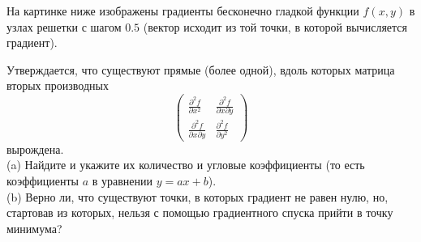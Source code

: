 \documentclass{article}
\begin{document}
На картинке ниже изображены градиенты бесконечно гладкой функции $f(x,y)$ в узлах решетки с шагом $0.5$ (вектор исходит из той точки, в которой вычисляется градиент).
\begin{figure}[h]
\end{figure}

Утверждается, что существуют прямые (более одной), вдоль которых матрица вторых производных
$$\left( \begin{array}{cc} \frac{\partial^2 f}{\partial x^2}& \frac{\partial^2 f}{\partial x \partial y}\\ \frac{\partial^2 f}{\partial x \partial y}&\frac{\partial^2 f}{\partial y^2} \end{array} \right)$$
вырождена.\\
(a) Найдите и укажите их количество и угловые коэффициенты (то есть коэффициенты $a$ в уравнении $y = ax + b$).\\
(b) Верно ли, что существуют точки, в которых градиент не равен нулю, но, стартовав из которых, нельзя с помощью градиентного спуска прийти в точку минимума?
\end{document}
